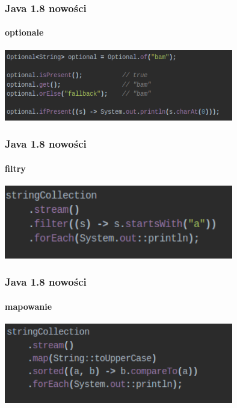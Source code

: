\documentclass{beamer}
\begin{document}
     \begin{frame}
\frametitle{Java 1.8 nowości }
\framesubtitle{optionale}
     \includegraphics[width=10cm]{optional.png}
   \end{frame}  
     \begin{frame}
\frametitle{Java 1.8 nowości }
\framesubtitle{filtry}
      \includegraphics[width=10cm]{filter.png}
      \end{frame}
      \begin{frame}
\frametitle{Java 1.8 nowości }
\framesubtitle{mapowanie}
      \includegraphics[width=10cm]{map.png}
\end{frame}
    
\end{document}
